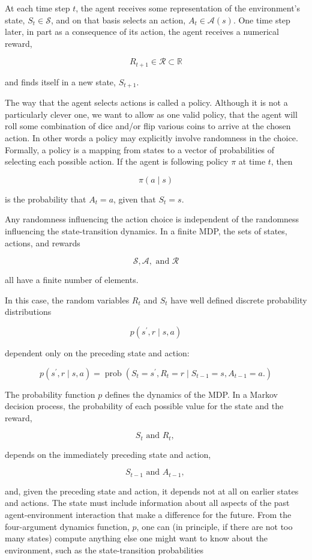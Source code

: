 \documentclass[11pt]{article}
\theoremstyle{plain} %
\theoremstyle{remark}
\begin{document}
At each time step $t$, the agent receives some representation of the
environment's state, $S_{t} \in \mathcal{S}$, and on that basis selects an
action, $A_{t} \in \mathcal{A}(s)$. One time step later, in part as a consequence of its action, the agent
receives a numerical reward,

$$
  R_{t+1} \in \mathcal{R} \subset \mathbb{R}
$$

and finds itself in a new state, $S_{t+1}$.

The way that the agent selects actions is called a policy. Although it is not a particularly clever one, we want to allow as one
valid policy, that the agent will roll some combination of dice and/or flip
various coins to arrive at the chosen action. In other words a policy may explicitly involve randomness in the choice. Formally, a policy is a mapping from states to a vector of probabilities
of selecting each possible action. If the agent is following policy $\pi$ at time $t$, then

$$
  \pi(a \mid s)
$$

is the probability that $A_{t}=a$, given that $S_{t}=s$.

Any randomness influencing the action choice is independent of the
randomness influencing the state-transition dynamics. In a finite MDP, the sets of states, actions, and rewards

$$
  \mathcal{S}, \mathcal{A}, \text { and } \mathcal{R}
$$

all have a finite number of elements.

In this case, the random variables $R_{t}$ and $S_{t}$ have well defined
discrete probability distributions

$$
  p\left(s^{\prime}, r \mid s, a\right)
$$

dependent only on the preceding state and action:

$$
  p\left(s^{\prime}, r \mid s, a\right)=\operatorname{prob}\left(S_{t}=s^{\prime}, R_{t}=r \mid S_{t-1}=s, A_{t-1}=a .\right)
$$

The probability function $p$ defines the dynamics of the MDP. In a Markov decision process, the probability of each possible value for
the state and the reward,

$$
  S_{t} \text { and } R_{t} \text {, }
$$

depends on the immediately preceding state and action,

$$
  S_{t-1} \text { and } A_{t-1} \text {, }
$$

and, given the preceding state and action, it depends not at all on earlier
states and actions.  The state must include information about all aspects of the past
agent-environment interaction that make a difference for the future. From the four-argument dynamics function, $p$, one can (in principle, if
there are not too many states) compute anything else one might want to know
about the environment, such as the state-transition probabilities
\end{document}
